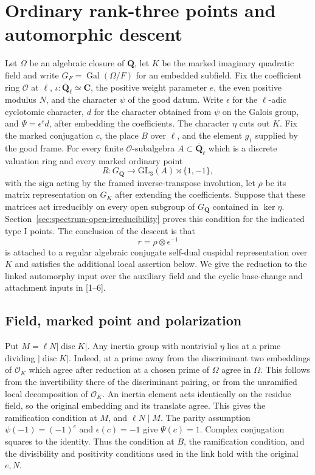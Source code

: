 \section{Ordinary rank-three points and automorphic descent}
\label{sec:ordinary-global-descent}

Let $\Omega$ be an algebraic closure of $\mathbf Q$, let $K$ be the marked imaginary quadratic field and write $G_F=\operatorname{Gal}(\Omega/F)$ for an embedded subfield. Fix the coefficient ring $\mathcal O$ at $\ell$, $\iota:\overline{\mathbf Q}_\ell\simeq\mathbf C$, the positive weight parameter $e$, the even positive modulus $N$, and the character $\psi$ of the good datum. Write $\epsilon$ for the $\ell$-adic cyclotomic character, $d$ for the character obtained from $\psi$ on the Galois group, and $\Psi=\epsilon^e d$, after embedding the coefficients. The character $\eta$ cuts out $K$. Fix the marked conjugation $c$, the place $B$ over $\ell$, and the element $g_1$ supplied by the good frame. For every finite $\mathcal O$-subalgebra $A\subset\overline{\mathbf Q}_\ell$ which is a discrete valuation ring and every marked ordinary point
\[
                R:G_{\mathbf Q}\longrightarrow
                 \mathrm{GL}_3(A)\rtimes\{1,-1\},
\]
with the sign acting by the framed inverse-transpose involution, let $\rho$ be its matrix representation on $G_K$ after extending the coefficients. Suppose that these matrices act irreducibly on every open subgroup of $G_{\mathbf Q}$ contained in $\ker\eta$. Section~\ref{sec:spectrum-open-irreducibility} proves this condition for the indicated type I points. The conclusion of the descent is that
\[
                       r=\rho\otimes\epsilon^{-1}
\]
is attached to a regular algebraic conjugate self-dual cuspidal representation over $K$ and satisfies the additional local assertion below. We give the reduction to the linked automorphy input over the auxiliary field and the cyclic base-change and attachment inputs in [1--6].

\subsection{Field, marked point and polarization}

Put $M=\ell N|\operatorname{disc}K|$. Any inertia group with nontrivial $\eta$ lies at a prime dividing $|\operatorname{disc}K|$. Indeed, at a prime away from the discriminant two embeddings of $\mathcal O_K$ which agree after reduction at a chosen prime of $\Omega$ agree in $\Omega$. This follows from the invertibility there of the discriminant pairing, or from the unramified local decomposition of $\mathcal O_K$. An inertia element acts identically on the residue field, so the original embedding and its translate agree. This gives the ramification condition at $M$, and $\ell N\mid M$. The parity assumption $\psi(-1)=(-1)^e$ and $\epsilon(c)=-1$ give $\Psi(c)=1$. Complex conjugation squares to the identity. Thus the condition at $B$, the ramification condition, and the divisibility and positivity conditions used in the link hold with the original $e,N$.

